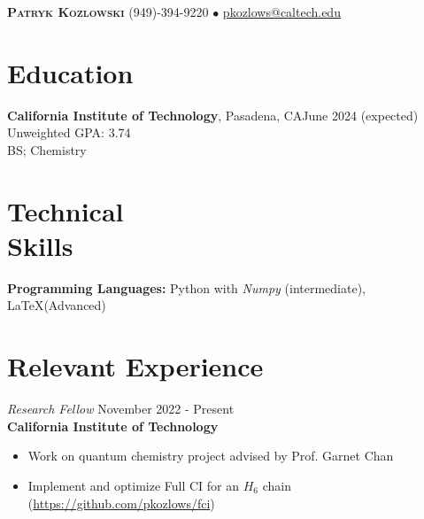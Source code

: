 \documentclass[margin,line]{resume}
\begin{document}
{\Large \textbf{\scshape Patryk Kozlowski}
\normalsize
\hspace{70mm}(949)-394-9220 $\bullet$ \url{pkozlows@caltech.edu}
}
\begin{resume}

\section{\mysidestyle Education}
\textbf{California Institute of Technology}, Pasadena, CA\hfill June 2024 (expected)\\
Unweighted GPA: 3.74\\
BS; Chemistry

\section{\mysidestyle Technical\\ Skills}
\textbf{Programming Languages:} Python with \emph{Numpy} (intermediate), \LaTeX  (Advanced)

\section{\mysidestyle Relevant Experience}
{\sl Research Fellow} \hfill November 2022 - Present\\
\textbf{California Institute of Technology}
\begin{itemize}
\item Work on quantum chemistry project advised by Prof. Garnet Chan
\item Implement and optimize Full CI for an $H_{6}$ chain (\url{https://github.com/pkozlows/fci})

\end{itemize}


\end{resume}
\end{document}
